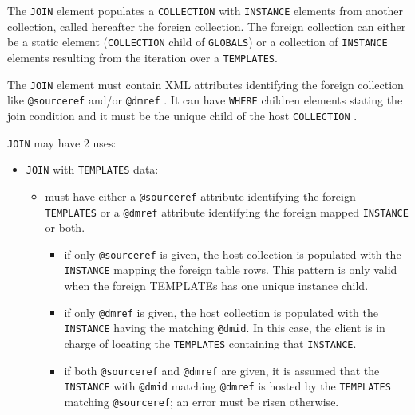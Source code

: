 The \texttt{JOIN} element populates a \texttt{COLLECTION} with \texttt{INSTANCE}  elements from another collection, called hereafter the foreign collection.
The foreign collection can either be a static element  (\texttt{COLLECTION} child of \texttt{GLOBALS}) or a collection of \texttt{INSTANCE} elements resulting from the iteration over a \texttt{TEMPLATES}.

The \texttt{JOIN} element must contain XML attributes identifying the foreign collection  like \texttt{@sourceref}  and/or \texttt{@dmref} . 
It can have \texttt{WHERE} children elements stating the join condition and it must be the unique child of the host \texttt{COLLECTION} .

 \texttt{JOIN} may have 2 uses:

\begin{itemize}

    \item \texttt{JOIN}  with \texttt{TEMPLATES} data:
       \begin{itemize}
         \item must have either a \texttt{@sourceref} attribute identifying the foreign \texttt{TEMPLATES} or a \texttt{@dmref} attribute identifying the foreign mapped \texttt{INSTANCE} or both.
             \begin{itemize}
               \item if only \texttt{@sourceref} is given, the host collection is populated with the \texttt{INSTANCE}  mapping the foreign table rows. 
                        This pattern is only valid when the foreign TEMPLATEs has  one unique instance child.
               \item if only \texttt{@dmref} is given,  the host collection is populated with the \texttt{INSTANCE}  having the matching \texttt{@dmid}. In this case, 
                        the client is in charge of locating the \texttt{TEMPLATES} containing that \texttt{INSTANCE}.
               \item if both \texttt{@sourceref} and \texttt{@dmref} are given, it is assumed that the \texttt{INSTANCE} with \texttt{@dmid} matching \texttt{@dmref} 
                        is hosted by the \texttt{TEMPLATES} matching \texttt{@sourceref}; an error must be risen otherwise.
             \end{itemize}
    \end{itemize}
  

\end{itemize}
